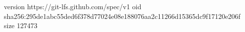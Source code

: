 version https://git-lfs.github.com/spec/v1
oid sha256:295de1abc55ded6f378d77024e08e188076aa2c11266d15365dc9f17120e206f
size 127473

